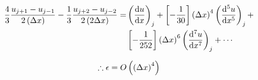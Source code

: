 \documentclass{article}
\numberwithin{figure}{section}
\numberwithin{equation}{section} %
\begin{document}
\begin{equation}
\def\u{\frac13}
\def\c{\frac43}
    \begin{split}
\c\frac{u_{j+1} - u_{j-1}}{2\Dx}-\u\frac{u_{j+2} -
u_{j-2}}{2\dDx} = & \derord{u}{x} + 
\left[ -\frac{1}{30} \right]\Dx^4\derord[5]{u}{x} + \\
& \left[ -\frac{1}{252} \right]\Dx^6\derord[7]{u}{x} + \cdots
    \end{split}
\label{eq:o4_s}
\end{equation}

\begin{equation}
	\therefore \epsilon = O\left( \left( \Delta x \right)^4 \right)
\end{equation}
\end{document}

